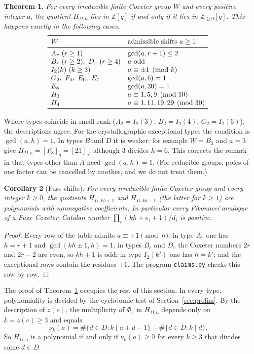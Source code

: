 \documentclass[11pt,a4paper]{article}
\newtheorem{theorem}{Theorem}[section]
\newtheorem{corollary}[theorem]{Corollary}
\theoremstyle{definition}\newtheorem{definition}[theorem]{Definition}
\theoremstyle{remark}\newtheorem{remark}[theorem]{Remark}\newtheorem{example}[theorem]{Example}
\numberwithin{equation}{section}
\begin{document}
\begin{theorem}\label{thm:cox}
For every irreducible finite Coxeter group $W$ and every positive integer $a$, the quotient $H_{D,a}$ lies in $\mathbb Z[q]$ if and only if it lies in $\mathbb Z_{\ge0}[q]$. This happens exactly in the following cases.
\[
\begin{array}{ll}
\toprule
 W & \text{admissible shifts }a\ge1\\
\midrule
 A_r\ (r\ge1) & \gcd(a,r+1)\le2\\
 B_r\ (r\ge2),\ D_r\ (r\ge4)& a\text{ odd}\\
 I_2(k)\ (k\ge3) & a\equiv\pm1\pmod k\\
 G_2,\ F_4,\ E_6,\ E_7 & \gcd(a,6)=1\\
 E_8 & \gcd(a,30)=1\\
 H_3 & a\equiv1,5,9\pmod {10}\\
 H_4 & a\equiv1,11,19,29\pmod {30}\\
\bottomrule
\end{array}
\]
\end{theorem}
Where types coincide in small rank ($A_2=I_2(3)$, $B_2=I_2(4)$, $G_2=I_2(6)$), the descriptions agree. For the crystallographic exceptional types the condition is $\gcd(a,h)=1$. In types $B$ and $D$ it is weaker: for example $W=B_3$ and $a=3$ give $H_{D,a}=[F_8]_q=[21]_q$, although $3$ divides $h=6$. This corrects the remark in \cite[Remark~4.5]{bck} that types other than $A$ need $\gcd(a,h)=1$. (For reducible groups, poles of one factor can be cancelled by another, and we do not treat them.)

\begin{corollary}[Fuss shifts]\label{cor:fuss}
For every irreducible finite Coxeter group and every integer $k\ge0$, the quotients $H_{D,kh+1}$ and $H_{D,kh-1}$ (the latter for $k\ge1$) are polynomials with nonnegative coefficients. In particular every Fibonacci analogue of a Fuss--Coxeter--Catalan number $\prod_i(kh+e_i+1)/d_i$ is positive.
\end{corollary}
\begin{proof}
Every row of the table admits $a\equiv\pm1\pmod h$: in type $A_r$ one has $h=r+1$ and $\gcd(kh\pm1,h)=1$; in types $B_r$ and $D_r$ the Coxeter numbers $2r$ and $2r-2$ are even, so $kh\pm1$ is odd; in type $I_2(k')$ one has $h=k'$; and the exceptional rows contain the residues $\pm1$. The program \texttt{claims.py} checks this row by row.
\end{proof}

The proof of Theorem~\ref{thm:cox} occupies the rest of this section. In every type, polynomiality is decided by the cyclotomic test of Section~\ref{sec:prelim}. By the description of $z(e)$, the multiplicity of $\Phi_e$ in $H_{D,a}$ depends only on $k=z(e)\ge3$ and equals
\begin{equation}\label{eq:mult}
 \nu_k(a)=\#\{d\in D:k\mid a+d-1\}-\#\{d\in D:k\mid d\}.
\end{equation}
So $H_{D,a}$ is a polynomial if and only if $\nu_k(a)\ge0$ for every $k\ge3$ that divides some $d\in D$.
\end{document}
